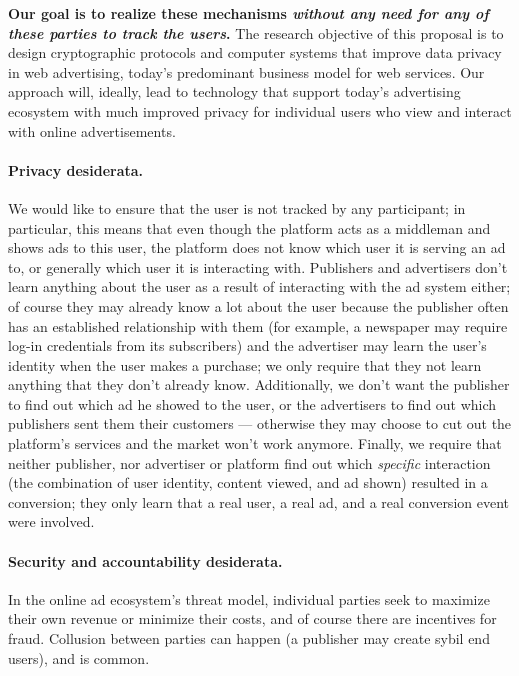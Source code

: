 \textbf{
Our goal is to realize these mechanisms \emph{without any need for any of these parties to track the users}.} 
The research objective of this proposal is to design cryptographic protocols and
computer systems that improve data privacy in web advertising, today's
predominant business model for web services.
%
Our approach will, ideally, lead to technology that support today's advertising
ecosystem with much improved privacy for individual users who view and
interact with online advertisements.
%

\paragraph{Privacy desiderata.}
We would like to ensure that the user is not tracked by any participant; in particular, this means that even though the platform acts as a middleman and shows ads to this user, the platform does not know which user it is serving an ad to, or generally which user it is interacting with.  Publishers and advertisers don't learn anything about the user as a result of interacting with the ad system either; of course they may already know a lot about the user because the publisher often has an established relationship with them (for example, a newspaper may require log-in credentials from its subscribers) and the advertiser may learn the user's identity when the user makes a purchase; we only require that they not learn anything that they don't already know.  Additionally, we don't want the publisher to find out which ad he showed to the user, or the advertisers to find out which publishers sent them their customers --- otherwise they may choose to cut out the platform's services and the market won't work anymore.  Finally, we require that 
neither publisher, nor advertiser or platform find out which \emph{specific} interaction (the combination of user identity, content viewed, and ad shown)
	resulted in a conversion; they only learn that a real user, a real ad, and a real conversion event were involved.

\paragraph{Security and accountability desiderata.}
%
%
In the online ad ecosystem's threat model, individual parties seek to maximize
their own revenue or minimize their costs, and of course there are incentives for fraud.
%
Collusion between parties can happen (\eg a publisher may create sybil end
users), and is common.
%

